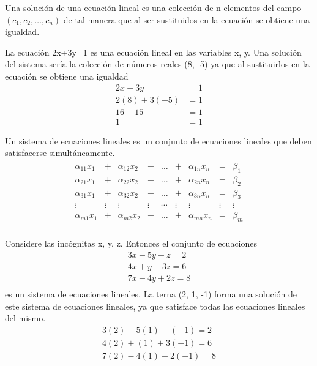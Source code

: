 Una solución de una ecuación lineal es una colección de n elementos del campo $(c_1, c_2, \hdots, c_n)$ de tal manera que al ser sustituidos en la ecuación se obtiene una igualdad. 
\begin{ejemplo}
La ecuación 2x+3y=1 es una ecuación lineal en las variables x, y. Una solución del sistema sería la colección de números reales (8, -5) ya que al sustituirlos en la ecuación se obtiene una igualdad
\begin{align*}
2x+3y&=1\\
2(8)+3(-5)&=1\\
16-15&=1\\
1&=1
\end{align*}
\end{ejemplo}
Un sistema de ecuaciones lineales es un conjunto de ecuaciones lineales que deben satisfacerse simultáneamente.
\begin{align*}
\begin{array}{ccccccccc}
    \alpha_{11} x_1&+&\alpha_{12} x_2&+&\hdots&+&\alpha_{1n} x_n&=&\beta_1\\
    \alpha_{21} x_1&+&\alpha_{22} x_2&+&\hdots&+&\alpha_{2n} x_n&=&\beta_2\\
    \alpha_{31} x_1&+&\alpha_{32} x_2&+&\hdots&+&\alpha_{3n} x_n&=&\beta_3\\
    \vdots&\vdots&\vdots&\vdots&\cdots&\vdots&\vdots&\vdots&\vdots\\
    \alpha_{m1} x_1&+&\alpha_{m2} x_2&+&\hdots&+&\alpha_{mn} x_n&=&\beta_m\\
\end{array}
\end{align*} 
\begin{ejemplo}
Considere las incógnitas x, y, z. Entonces el conjunto de ecuaciones
\begin{align*}
3x-5y-z=2\\
4x+y+3z=6\\
7x-4y+2z=8\\
\end{align*}
es un sistema de ecuaciones lineales. La terna (2, 1, -1) forma una solución de este sistema de ecuaciones lineales, ya que satisface todas las ecuaciones lineales del mismo.
\begin{align*}
3(2)-5(1)-(-1)=2\\
4(2)+(1)+3(-1)=6\\
7(2)-4(1)+2(-1)=8\\
\end{align*}
\end{ejemplo}

